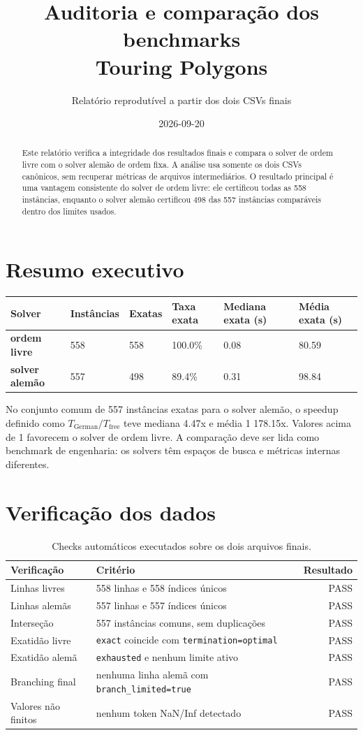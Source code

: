 \documentclass[10pt,a4paper]{article}
\title{Auditoria e comparação dos benchmarks\\[3pt]\large Touring Polygons}
\author{Relatório reprodutível a partir dos dois CSVs finais}
\date{2026-09-20}
\newcommand{\free}{\textcolor{freecolor}{\textbf{ordem livre}}}
\newcommand{\german}{\textcolor{germancolor}{\textbf{solver alemão}}}
\begin{document}
\maketitle

\begin{abstract}
Este relatório verifica a integridade dos resultados finais e compara o solver de ordem livre com o solver alemão de ordem fixa. A análise usa somente os dois CSVs canônicos, sem recuperar métricas de arquivos intermediários. O resultado principal é uma vantagem consistente do solver de ordem livre: ele certificou todas as 558 instâncias, enquanto o solver alemão certificou 498 das 557 instâncias comparáveis dentro dos limites usados.
\end{abstract}

\section*{Resumo executivo}
\begin{tabularx}{\textwidth}{@{}>{\bfseries}lXXXXX@{}}
\toprule
Solver & Instâncias & Exatas & Taxa exata & Mediana exata (s) & Média exata (s) \\
\midrule
\free & 558 & 558 & 100.0\% & 0.08 & 80.59 \\
\german & 557 & 498 & 89.4\% & 0.31 & 98.84 \\
\bottomrule
\end{tabularx}

No conjunto comum de 557 instâncias exatas para o solver alemão, o speedup definido como $T_{\mathrm{German}}/T_{\mathrm{free}}$ teve mediana 4.47x e média 1 178.15x. Valores acima de 1 favorecem o solver de ordem livre. A comparação deve ser lida como benchmark de engenharia: os solvers têm espaços de busca e métricas internas diferentes.

\section{Verificação dos dados}
\begin{table}[H]
\centering
\caption{Checks automáticos executados sobre os dois arquivos finais.}
\begin{tabularx}{0.95\textwidth}{@{}lXr@{}}
\toprule
Verificação & Critério & Resultado \\
\midrule
Linhas livres & 558 linhas e 558 índices únicos & PASS \\
Linhas alemãs & 557 linhas e 557 índices únicos & PASS \\
Interseção & 557 instâncias comuns, sem duplicações & PASS \\
Exatidão livre & \texttt{exact} coincide com \texttt{termination=optimal} & PASS \\
Exatidão alemã & \texttt{exhausted} e nenhum limite ativo & PASS \\
Branching final & nenhuma linha alemã com \texttt{branch\_limited=true} & PASS \\
Valores não finitos & nenhum token NaN/Inf detectado & PASS \\
\bottomrule
\end{tabularx}
\end{table}
\end{document}
